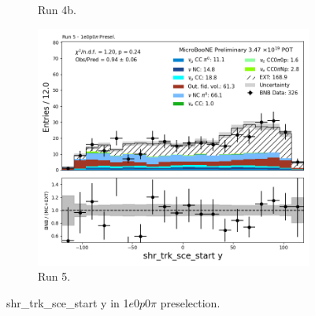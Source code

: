 \begin{figure}[H]
\begin{subfigure}[t]{0.32\linewidth}
        \caption{Run 4b.}
    \end{subfigure}%
    \hspace{0.2cm}%
    \begin{subfigure}[t]{0.32\linewidth}
        \includegraphics[width=\linewidth]{technote/Appendix_Preselection/Figures/1e0p0pi/Run5/shr_trk_sce_start_y_Run5_1e0p0pi_Presel.png}
        \caption{Run 5.}
    \end{subfigure}
    \caption{shr\_trk\_sce\_start y in 1$e$0$p$0$\pi$ preselection.}
\end{figure}

